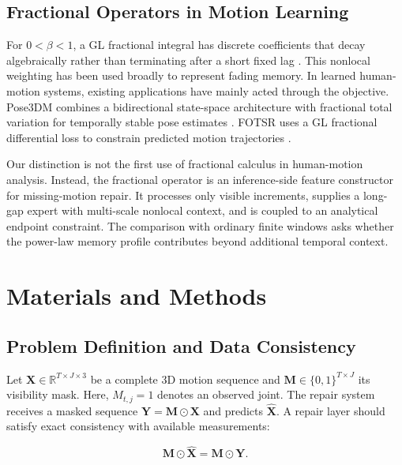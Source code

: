 \documentclass[fractalfract,article,submit,moreauthors,pdftex]{Definitions/mdpi}
\begin{document}
\subsection{Fractional Operators in Motion Learning}

For $0<\beta<1$, a GL fractional integral has discrete coefficients that decay algebraically rather than terminating after a short fixed lag \cite{podlubny1999fractional}. This nonlocal weighting has been used broadly to represent fading memory. In learned human-motion systems, existing applications have mainly acted through the objective. Pose3DM combines a bidirectional state-space architecture with fractional total variation for temporally stable pose estimates \cite{wang2025pose3dm}. FOTSR uses a GL fractional differential loss to constrain predicted motion trajectories \cite{guo2026fotsr}.

Our distinction is not the first use of fractional calculus in human-motion analysis. Instead, the fractional operator is an inference-side feature constructor for missing-motion repair. It processes only visible increments, supplies a long-gap expert with multi-scale nonlocal context, and is coupled to an analytical endpoint constraint. The comparison with ordinary finite windows asks whether the power-law memory profile contributes beyond additional temporal context.

\section{Materials and Methods}

\subsection{Problem Definition and Data Consistency}

Let $\mathbf{X}\in\mathbb{R}^{T\times J\times 3}$ be a complete 3D motion sequence and $\mathbf{M}\in\{0,1\}^{T\times J}$ its visibility mask. Here, $M_{t,j}=1$ denotes an observed joint. The repair system receives a masked sequence $\mathbf{Y}=\mathbf{M}\odot\mathbf{X}$ and predicts $\widehat{\mathbf{X}}$. A repair layer should satisfy exact consistency with available measurements:

\begin{linenomath}
\begin{equation}
\mathbf{M}\odot\widehat{\mathbf{X}}=\mathbf{M}\odot\mathbf{Y}.
\label{eq:data_consistency}
\end{equation}
\end{linenomath}
\end{document}
